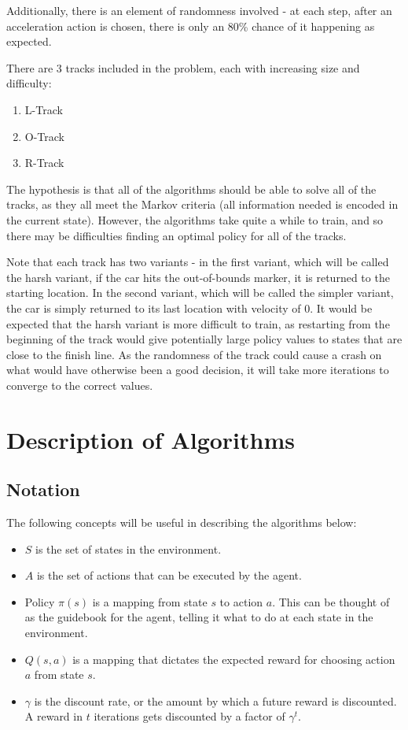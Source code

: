 \documentclass{amsart}
\begin{document}
    Additionally, there is an element of randomness involved - at each step, after an acceleration
    action is chosen, there is only an 80\% chance of it happening as expected.

    There are 3 tracks included in the problem, each with increasing size and difficulty:
    \begin{enumerate}
        \item L-Track
        \item O-Track
        \item R-Track
    \end{enumerate}

    The hypothesis is that all of the algorithms should be able to solve all of the tracks, as they all meet the
    Markov criteria (all information needed is encoded in the current state). However, the algorithms take quite a
    while to train, and so there may be difficulties finding an optimal policy for all of the tracks.

    Note that each track has two variants - in the first variant, which will be called the harsh variant,
    if the car hits the out-of-bounds marker, it is returned to the starting location. In the second variant,
    which will be called the simpler variant, the car is simply returned to its last location with velocity of 0.
    It would be expected that the harsh variant is more difficult to train, as restarting from the beginning of
    the track would give potentially large policy values to states that are close to the finish line. As the randomness
    of the track could cause a crash on what would have otherwise been a good decision, it will take more iterations  to
    converge to the correct values.

    \section{Description of Algorithms}
    \subsection{Notation}
    The following concepts will be useful in describing the algorithms below:
    \begin{itemize}
        \item $S$ is the set of states in the environment.
        \item $A$ is the set of actions that can be executed by the agent.
        \item Policy $\pi(s)$ is a mapping from state $s$ to action $a$. This can be thought of as the
        guidebook for the agent, telling it what to do at each state in the environment.
        \item $Q(s, a)$ is a mapping that dictates the expected reward for choosing action $a$ from state $s$.
        \item $\gamma$ is the discount rate, or the amount by which a future reward is discounted. A reward
        in $t$ iterations gets discounted by a factor of $\gamma^t$.
    \end{itemize}
\end{document}
